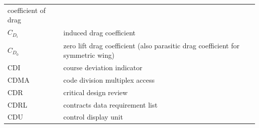 \documentclass[
]{book}
\begin{document}
\begin{longtable}[]{@{}ll@{}}
\begin{minipage}[t]{0.47\columnwidth}
coefficient of drag\strut
\end{minipage}\tabularnewline
\begin{minipage}[t]{0.47\columnwidth}\raggedright
\(C_{D_i}\)\strut
\end{minipage} & \begin{minipage}[t]{0.47\columnwidth}\raggedright
induced drag coefficient\strut
\end{minipage}\tabularnewline
\begin{minipage}[t]{0.47\columnwidth}\raggedright
\(C_{D_0}\)\strut
\end{minipage} & \begin{minipage}[t]{0.47\columnwidth}\raggedright
zero lift drag coefficient (also parasitic drag coefficient for symmetric wing)\strut
\end{minipage}\tabularnewline
\begin{minipage}[t]{0.47\columnwidth}\raggedright
CDI\strut
\end{minipage} & \begin{minipage}[t]{0.47\columnwidth}\raggedright
course deviation indicator\strut
\end{minipage}\tabularnewline
\begin{minipage}[t]{0.47\columnwidth}\raggedright
CDMA\strut
\end{minipage} & \begin{minipage}[t]{0.47\columnwidth}\raggedright
code division multiplex access\strut
\end{minipage}\tabularnewline
\begin{minipage}[t]{0.47\columnwidth}\raggedright
CDR\strut
\end{minipage} & \begin{minipage}[t]{0.47\columnwidth}\raggedright
critical design review\strut
\end{minipage}\tabularnewline
\begin{minipage}[t]{0.47\columnwidth}\raggedright
CDRL\strut
\end{minipage} & \begin{minipage}[t]{0.47\columnwidth}\raggedright
contracts data requirement list\strut
\end{minipage}\tabularnewline
\begin{minipage}[t]{0.47\columnwidth}\raggedright
CDU\strut
\end{minipage} & \begin{minipage}[t]{0.47\columnwidth}\raggedright
control display unit\strut
\end{minipage}\tabularnewline

\end{longtable}
\end{document}
